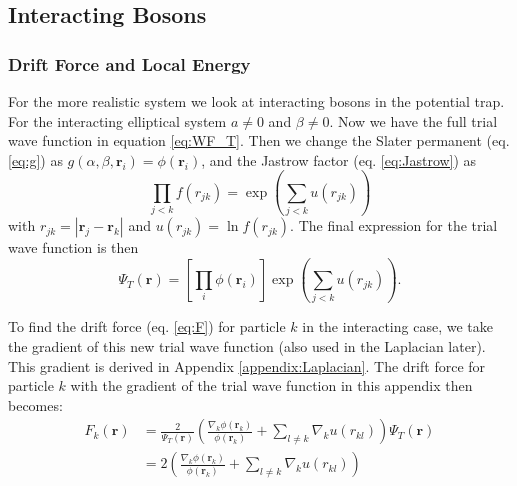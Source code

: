 \documentclass[12pt,a4paper,english]{article}
\begin{document}
\subsection{Interacting Bosons}
\label{subsect:interact}
\subsubsection{Drift Force and Local Energy}
\label{subsubsect:local_E_int}
For the more realistic system we look at interacting bosons in the potential trap. For the interacting elliptical system $a\neq0$ and $\beta\neq0$. Now we have the full trial wave function in equation \ref{eq:WF_T}. Then we change the Slater permanent (eq. \ref{eq:g}) as $g(\alpha,\beta,\mathbf{r}_i)=\phi(\textbf{r}_i)$, and the Jastrow factor (eq. \ref{eq:Jastrow}) as 
\[\prod_{j<k}f(r_{jk})=\exp\left(\sum_{j<k}u(r_{jk})\right)\]
with $r_{jk}=|\textbf{r}_j-\textbf{r}_k|$ and $u(r_{jk})=\ln f(r_{jk})$. The final expression for the trial wave function is then
\begin{equation}
\label{eq:WF_T_int}
\Psi_T(\mathbf{r})=\left[\prod_i \phi(\textbf{r}_i)\right]
\exp\left(\sum_{j<k}u(r_{jk})\right).
\end{equation}

To find the drift force (eq. \ref{eq:F}) for particle $k$ in the interacting case, we take the gradient of this new trial wave function (also used in the Laplacian later). This gradient is derived in Appendix \ref{appendix:Laplacian}. The drift force for particle $k$ with the gradient of the trial wave function in this appendix then becomes:
\begin{align}
\label{eq:drift_force_int}
F_k({\textbf{r}})&=\frac{2}{\Psi_T(\textbf{r})}\left(\frac{\nabla_k\phi(\textbf{r}_k)}{\phi(\textbf{r}_k)}+\sum_{l\neq k}\nabla_k u(r_{kl})\right)\Psi_T(\textbf{r})\nonumber\\
&=2\left(\frac{\nabla_k\phi(\textbf{r}_k)}{\phi(\textbf{r}_k)}+\sum_{l\neq k}\nabla_k u(r_{kl})\right)
\end{align}
\end{document}
